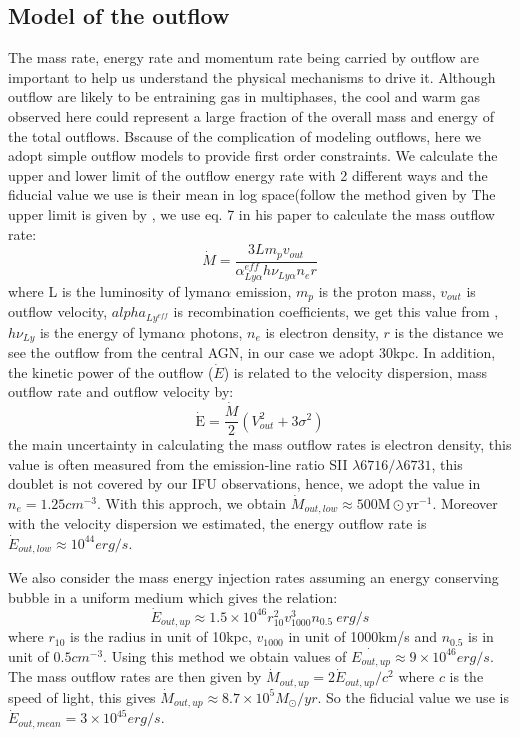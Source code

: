 \subsection{Model of the outflow}

The mass rate, energy rate and momentum rate being carried by outflow are important to help us understand the physical mechanisms to drive it. Although outflow are likely to be entraining gas in multiphases, the cool and warm gas observed here could represent a large fraction of the overall mass and energy of the total outflows. Bscause of the complication of modeling outflows, here we adopt simple outflow models to provide first order constraints. We calculate the upper and lower limit of the outflow energy rate with 2 different ways and the fiducial value we use is their mean in log space(follow the method given by \cite{harrison2014kiloparsec}
	The upper limit is given by \cite{rodriguez2013importance} , we use eq. 7 in his paper to calculate the mass outflow rate:
	\begin{equation}
		 \dot{M}=\frac{3 L m_{p} v_{o u t}}{\alpha_{Ly \alpha}^{e f f} h \nu_{Ly \alpha} n_{e} r}
	\end{equation}
	where L is the luminosity of lyman$\alpha$ emission, $m_{p}$ is the proton mass, $v_{o u t}$ is outflow velocity, $alpha_{Ly^{e f f}}$ is recombination coefficients, we get this value from \cite{storey1995recombination} , $h\nu_{Ly}$ is the energy of lyman$\alpha$ photons, $n_{e}$ is electron density, $r$ is the distance we see the outflow from the central AGN, in our case we adopt 30kpc. In addition, the kinetic power of the outflow ($\dot{E}$) is related to the velocity dispersion, mass outflow rate and outflow velocity by:
	\begin{equation}
		 \dot{\mathrm{E}}=\frac{\dot{M}}{2}\left(V_{o u t}^{2}+3 \sigma^{2}\right)
	\end{equation}
	the main uncertainty in calculating the mass outflow rates is electron density, this value is often measured from the emission-line ratio SII $\lambda6716/\lambda6731$, this doublet is not covered by our IFU observations, hence, we adopt the value in \cite{cai2017discovery} $n_{e}=1.25 cm^{-3}$. With this approch, we obtain $\dot{M}_{out,low} \approx 500\mathrm{M} \odot \mathrm{yr}^{-1}$. Moreover with the velocity dispersion we estimated, the energy outflow rate is $\dot{E}_{out,low} \approx 10^{44} erg/s$.
	
	We also consider the mass energy injection rates assuming an energy conserving bubble in a uniform medium \cite{heckman1990nature} which gives the relation:
	\begin{equation}
		\dot{E}_{o u t, u p} \approx 1.5 \times 10^{46} r_{10}^{2}v_{1000}^{3} n_{0.5} \ erg/s
	\end{equation}
	where $r_{10}$ is the radius in unit of 10kpc, $v_{1000}$ in unit of 1000km/s and $n_{0.5}$ is in unit of $0.5 cm^{-3}$. Using this method we obtain values of $\dot{E_{out,up}} \approx 9 \times 10^{46} erg/s$. The mass outflow rates are then given by $\dot{M}_{out,up}=2 \dot{E}_{out,up}/c^{2}$ where $c$ is the speed of light, this gives $\dot{M}_{out,up} \approx 8.7 \times 10^{5}M_{\odot}/yr$. So the fiducial value we use is $\dot{E}_{out,mean}=3 \times 10^{45} erg/s$.
	
